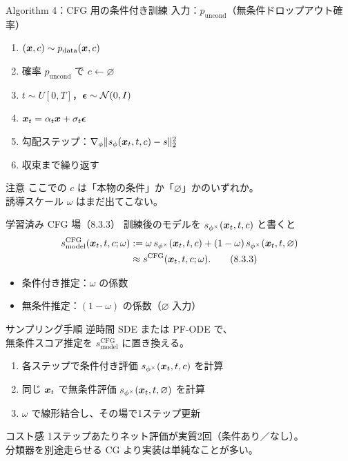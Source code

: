 \asmain
\begin{frame}{Algorithm 4：CFG 用の条件付き訓練}
    入力：$p_{\mathrm{uncond}}$（無条件ドロップアウト確率）
    \begin{enumerate}
        \item $(\bm{x},c)\sim p_{\mathrm{data}}(\bm{x},c)$
        \item 確率 $p_{\mathrm{uncond}}$ で $c\leftarrow\varnothing$
        \item $t\sim U[0,T]$，$\bm{\epsilon}\sim\mathcal{N}(0,I)$
        \item $\bm{x}_t=\alpha_t\bm{x}+\sigma_t\bm{\epsilon}$
        \item 勾配ステップ：$\nabla_\phi\|s_\phi(\bm{x}_t,t,c)-s\|_2^{2}$
        \item 収束まで繰り返す
    \end{enumerate}
    \begin{alertblock}{注意}
        ここでの $c$ は「本物の条件」か「$\varnothing$」かのいずれか。\\
        誘導スケール $\omega$ はまだ出てこない。
    \end{alertblock}
\end{frame}
\asmain
\begin{frame}{学習済み CFG 場（8.3.3）}
    訓練後のモデルを $s_{\phi^\times}(\bm{x}_t,t,c)$ と書くと
    \begin{align*}
        s^{\mathrm{CFG}}_{\mathrm{model}}(\bm{x}_t,t,c;\omega)
        &:=
        \omega\,s_{\phi^\times}(\bm{x}_t,t,c)
        +(1-\omega)\,s_{\phi^\times}(\bm{x}_t,t,\varnothing) \\
        &\approx
        s^{\mathrm{CFG}}(\bm{x}_t,t,c;\omega).
        \tag{8.3.3}
    \end{align*}
    \begin{itemize}
        \item 条件付き推定：$\omega$ の係数
        \item 無条件推定：$(1-\omega)$ の係数（$\varnothing$ 入力）
    \end{itemize}
\end{frame}
\asmain
\begin{frame}{サンプリング手順}
    逆時間 SDE または PF-ODE で、\\
    無条件スコア推定を $s^{\mathrm{CFG}}_{\mathrm{model}}$ に置き換える。
    \begin{enumerate}
        \item 各ステップで条件付き評価 $s_{\phi^\times}(\bm{x}_t,t,c)$ を計算
        \item 同じ $\bm{x}_t$ で無条件評価 $s_{\phi^\times}(\bm{x}_t,t,\varnothing)$ を計算
        \item $\omega$ で線形結合し、その場で1ステップ更新
    \end{enumerate}
    \begin{exampleblock}{コスト感}
        1ステップあたりネット評価が実質2回（条件あり／なし）。\\
        分類器を別途走らせる CG より実装は単純なことが多い。
    \end{exampleblock}
\end{frame}
